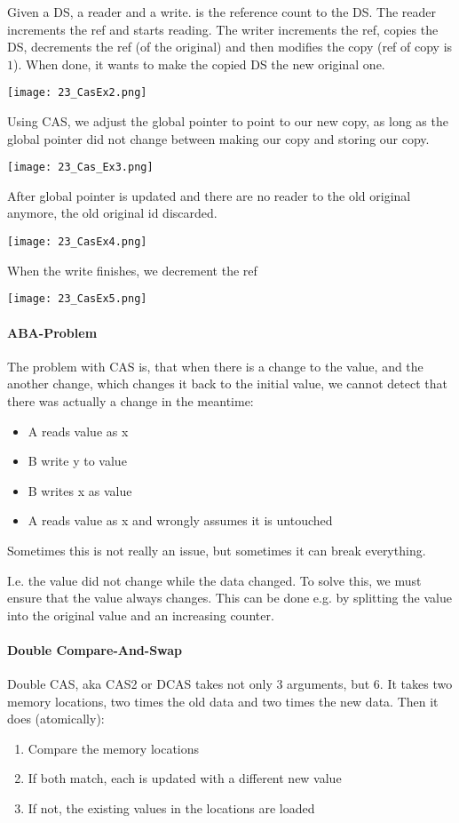 Given a DS, a reader and a write.  is the reference count to the DS. The reader increments the ref and starts reading. The writer increments the ref, copies the DS, decrements the ref (of the original) and then modifies the copy (ref of copy is $1$). When done, it wants to make the copied DS the new original one.

\texttt{[image: 23\_CasEx2.png]}

Using CAS, we adjust the global pointer to point to our new copy, as long as the global pointer did not change between making our copy and storing our copy.

\texttt{[image: 23\_Cas\_Ex3.png]}

After global pointer is updated and there are no reader to the old original anymore, the old original id discarded.

\texttt{[image: 23\_CasEx4.png]}

When the write finishes, we decrement the ref

\texttt{[image: 23\_CasEx5.png]}

\paragraph{ABA-Problem}
The problem with CAS is, that when there is a change to the value, and the another change, which changes it back to the initial value, we cannot detect that there was actually a change in the meantime:

\begin{itemize}
    \item A reads value as x
    \item B write y to value
    \item B writes x as value
    \item A reads value as x and wrongly assumes it is untouched
\end{itemize}

Sometimes this is not really an issue, but sometimes it can break everything.

I.e. the value did not change while the data changed. To solve this, we must ensure that the value always changes. This can be done e.g. by splitting the value into the original value and an increasing counter. 

\paragraph{Double Compare-And-Swap}
Double CAS, aka CAS2 or DCAS takes not only $3$ arguments, but $6$. It takes two memory locations, two times the old data and two times the new data. Then it does (atomically):
\begin{enumerate}
    \item Compare the memory locations
    \item If both match, each is updated with a different new value
    \item If not, the existing values in the locations are loaded
\end{enumerate}

